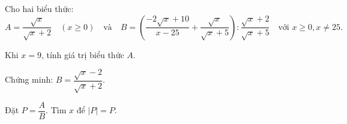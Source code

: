 
\begin{bt}
Cho hai biểu thức:
\[ A = \dfrac{\sqrt{x}}{\sqrt{x}+2} \quad (x \ge 0) \quad \text{và} \quad B = \left( \dfrac{-2\sqrt{x}+10}{x-25} + \dfrac{\sqrt{x}}{\sqrt{x}+5} \right) : \dfrac{\sqrt{x}+2}{\sqrt{x}+5} \quad \text{với } x \ge 0, x \ne 25. \]
\begin{cacy}
\item Khi $x=9$, tính giá trị biểu thức $A$.
\item Chứng minh: $B = \dfrac{\sqrt{x}-2}{\sqrt{x}+2}$.
\item Đặt $P = \dfrac{A}{B}$. Tìm $x$ để $|P| = P$.
\end{cacy}
\loigiai{}
\end{bt}
